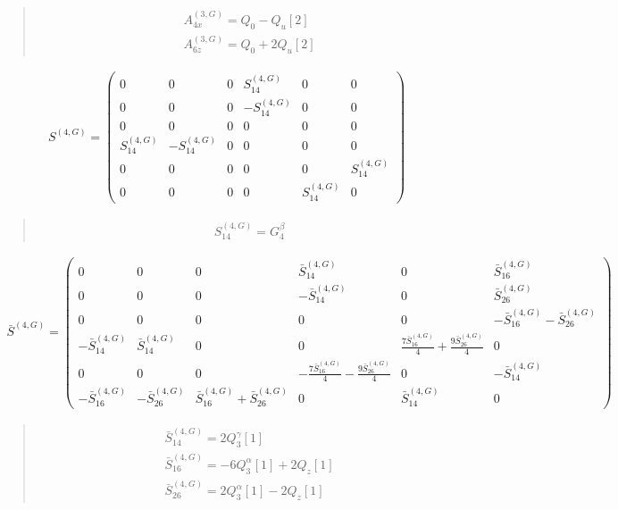 \documentclass[fleqn,10pt]{jsarticle}
\begin{document}
\begin{quote}
\begin{align*}
& A^{(3,G)}_{4x} = Q_{0} - Q_{u}[2] \\
& A^{(3,G)}_{6z} = Q_{0} + 2 Q_{u}[2]
\end{align*}
\end{quote}
\begin{align*}
S^{(4,G)} = \begin{pmatrix} 0 & 0 & 0 & S^{(4,G)}_{14} & 0 & 0 \\ 0 & 0 & 0 & - S^{(4,G)}_{14} & 0 & 0 \\ 0 & 0 & 0 & 0 & 0 & 0 \\ S^{(4,G)}_{14} & - S^{(4,G)}_{14} & 0 & 0 & 0 & 0 \\ 0 & 0 & 0 & 0 & 0 & S^{(4,G)}_{14} \\ 0 & 0 & 0 & 0 & S^{(4,G)}_{14} & 0 \end{pmatrix}
\end{align*}
\begin{quote}
\begin{align*}
& S^{(4,G)}_{14} = G_{4}^{\beta}
\end{align*}
\end{quote}
\begin{align*}
\bar{S}^{(4,G)} = \begin{pmatrix} 0 & 0 & 0 & \bar{S}^{(4,G)}_{14} & 0 & \bar{S}^{(4,G)}_{16} \\ 0 & 0 & 0 & - \bar{S}^{(4,G)}_{14} & 0 & \bar{S}^{(4,G)}_{26} \\ 0 & 0 & 0 & 0 & 0 & - \bar{S}^{(4,G)}_{16} - \bar{S}^{(4,G)}_{26} \\ - \bar{S}^{(4,G)}_{14} & \bar{S}^{(4,G)}_{14} & 0 & 0 & \frac{7 \bar{S}^{(4,G)}_{16}}{4} + \frac{9 \bar{S}^{(4,G)}_{26}}{4} & 0 \\ 0 & 0 & 0 & - \frac{7 \bar{S}^{(4,G)}_{16}}{4} - \frac{9 \bar{S}^{(4,G)}_{26}}{4} & 0 & - \bar{S}^{(4,G)}_{14} \\ - \bar{S}^{(4,G)}_{16} & - \bar{S}^{(4,G)}_{26} & \bar{S}^{(4,G)}_{16} + \bar{S}^{(4,G)}_{26} & 0 & \bar{S}^{(4,G)}_{14} & 0 \end{pmatrix}
\end{align*}
\begin{quote}
\begin{align*}
& \bar{S}^{(4,G)}_{14} = 2 Q_{3}^{\gamma}[1] \\
& \bar{S}^{(4,G)}_{16} = - 6 Q_{3}^{\alpha}[1] + 2 Q_{z}[1] \\
& \bar{S}^{(4,G)}_{26} = 2 Q_{3}^{\alpha}[1] - 2 Q_{z}[1]
\end{align*}
\end{quote}
\end{document}
